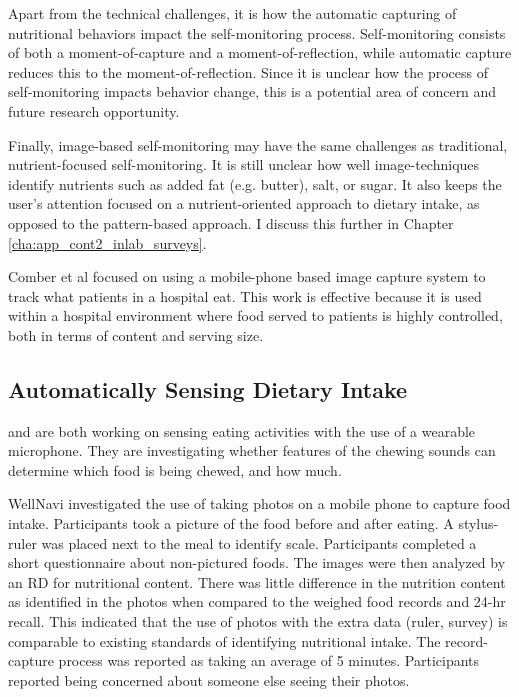 Apart from the technical challenges, it is how the automatic capturing of nutritional behaviors impact the self-monitoring process. Self-monitoring consists of both a moment-of-capture and a moment-of-reflection, while automatic capture reduces this to the moment-of-reflection. Since it is unclear how the process of self-monitoring impacts behavior change, this is a potential area of concern and future research opportunity. 

Finally, image-based self-monitoring may have the same challenges as traditional, nutrient-focused self-monitoring. It is still unclear how well image-techniques identify nutrients such as added fat (e.g. butter), salt, or sugar. It also keeps the user's attention focused on a nutrient-oriented approach to dietary intake, as opposed to the pattern-based approach. I discuss this further in Chapter \ref{cha:app_cont2_inlab_surveys}. 

Comber et al \citep{comber_supporting_2012} focused on using a mobile-phone based image capture system to track what patients in a hospital eat. This work is effective because it is used within a hospital environment where food served to patients is highly controlled, both in terms of content and serving size. 

\subsection{Automatically Sensing Dietary Intake}
\citep{Pabler2011} and \citep{amft_detection_2005} are both working on sensing eating activities with the use of a wearable microphone. They are investigating whether features of the chewing sounds can determine which food is being chewed, and how much. 

WellNavi \citep{wang_development_2006} investigated the use of taking photos on a mobile phone to capture food intake. Participants took a picture of the food before and after eating.  A stylus-ruler was placed next to the meal to identify scale. Participants completed a short questionnaire about non-pictured foods. The images were then analyzed by an RD for nutritional content. There was little difference in the nutrition content as identified in the photos when compared to the weighed food records and 24-hr recall. This indicated that the use of photos with the extra data (ruler, survey) is comparable to existing standards of identifying nutritional intake. The record-capture process was reported as taking an average of 5 minutes. Participants reported being concerned about someone else seeing their photos. 





